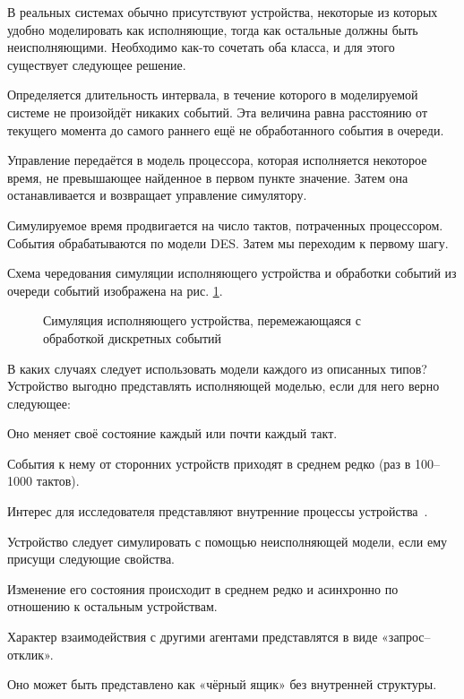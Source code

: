 В реальных системах обычно присутствуют устройства, некоторые из которых удобно моделировать как исполняющие, тогда как остальные должны быть неисполняющими. Необходимо как-то сочетать оба класса, и для этого существует следующее решение.

\begin{enumerate*}
\item Определяется длительность интервала, в течение которого в моделируемой системе не произойдёт никаких событий. Эта величина равна расстоянию от текущего момента до самого раннего ещё не обработанного события в очереди.

\item Управление передаётся в модель процессора, которая исполняется  некоторое время, не превышающее найденное в первом пункте значение. Затем она останавливается и возвращает управление симулятору.

\item Симулируемое время продвигается на число тактов, потраченных процессором. События обрабатываются по модели DES. Затем мы переходим к первому шагу.
\end{enumerate*}

Схема чередования симуляции исполняющего устройства и обработки событий из очереди событий изображена на рис. \ref{fig:queue2}.

\begin{figure}[htb]
    \centering
    \caption{Симуляция исполняющего устройства, перемежающаяся с обработкой дискретных событий}
    \label{fig:queue2}
\end{figure}

В каких случаях следует использовать модели каждого из описанных типов? Устройство выгодно представлять исполняющей моделью, если для него верно следующее:
\begin{enumerate*}
    \item Оно меняет своё состояние каждый или почти каждый такт.
    \item События к нему от сторонних устройств приходят в среднем редко (раз в 100–1000 тактов).
    \item Интерес для исследователя представляют внутренние процессы устройства~\cite{fritzson2004principles}.
\end{enumerate*}

Устройство следует симулировать с помощью неисполняющей модели, если ему присущи следующие свойства.
\begin{enumerate*}
    \item Изменение его состояния происходит в среднем редко и асинхронно по отношению к остальным устройствам.
    \item Характер взаимодействия с другими агентами представлятся в виде «запрос–отклик».
    \item Оно может быть представлено как «чёрный ящик» без внутренней структуры.
\end{enumerate*}

